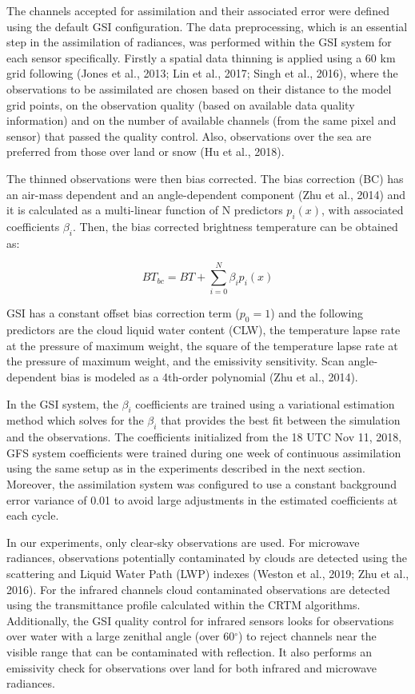 \documentclass[final,5p,times,twocolumn,authoryear]{elsarticle} %
\begin{document}
The channels accepted for assimilation and their associated error were defined using the default GSI configuration. The data preprocessing, which is an essential step in the assimilation of radiances, was performed within the GSI system for each sensor specifically. Firstly a spatial data thinning is applied using a 60 km grid following (Jones et al., 2013; Lin et al., 2017; Singh et al., 2016), where the observations to be assimilated are chosen based on their distance to the model grid points, on the observation quality (based on available data quality information) and on the number of available channels (from the same pixel and sensor) that passed the quality control. Also, observations over the sea are preferred from those over land or snow (Hu et al., 2018).

The thinned observations were then bias corrected. The bias correction (BC) has an air-mass dependent and an angle-dependent component (Zhu et al., 2014) and it is calculated as a multi-linear function of N predictors \(p_i(x)\), with associated coefficients \(\beta_i\). Then, the bias corrected brightness temperature can be obtained as:

\[\mathit{BT_{bc}} =\mathit{ BT} + \sum_{i = 0}^{N} \beta_i p_i (x)\]

GSI has a constant offset bias correction term (\(p_0 = 1\)) and the following predictors are the cloud liquid water content (CLW), the temperature lapse rate at the pressure of maximum weight, the square of the temperature lapse rate at the pressure of maximum weight, and the emissivity sensitivity. Scan angle-dependent bias is modeled as a 4th-order polynomial (Zhu et al., 2014).

In the GSI system, the \(\beta_i\) coefficients are trained using a variational estimation method which solves for the \(\beta_i\) that provides the best fit between the simulation and the observations. The coefficients initialized from the 18 UTC Nov 11, 2018, GFS system coefficients were trained during one week of continuous assimilation using the same setup as in the experiments described in the next section. Moreover, the assimilation system was configured to use a constant background error variance of 0.01 to avoid large adjustments in the estimated coefficients at each cycle.

In our experiments, only clear-sky observations are used. For microwave radiances, observations potentially contaminated by clouds are detected using the scattering and Liquid Water Path (LWP) indexes (Weston et al., 2019; Zhu et al., 2016). For the infrared channels cloud contaminated observations are detected using the transmittance profile calculated within the CRTM algorithms. Additionally, the GSI quality control for infrared sensors looks for observations over water with a large zenithal angle (over 60\(^{\circ}\)) to reject channels near the visible range that can be contaminated with reflection. It also performs an emissivity check for observations over land for both infrared and microwave radiances.
\end{document}
